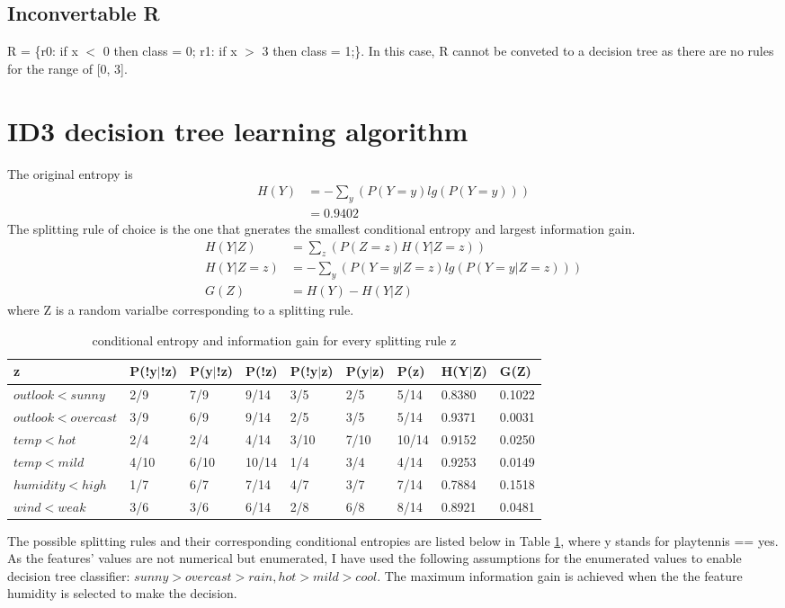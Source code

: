 \documentclass[12pt]{article}
\begin{document}
\subsection{Inconvertable R}
R = \{r0: if x $<$ 0 then class = 0; r1: if x $>$ 3 then class = 1;\}. In this case, R cannot be conveted to a decision tree as there are no rules for the range of [0, 3].
\section{ID3 decision tree learning algorithm}
The original entropy is 
\begin{align}
  H(Y) &= - \sum_{y} (P(Y = y) lg(P(Y = y))) \\
  &= 0.9402
\end{align}
The splitting rule of choice is the one that gnerates the smallest conditional entropy and largest information gain.
\begin{align}
  H(Y|Z) &= \sum_{z} (P(Z = z) H(Y | Z = z)) \\
  H(Y|Z=z) &= - \sum_{y} (P(Y = y|Z=z) lg(P(Y = y|Z=z))) \\
  G(Z) &= H(Y) - H(Y|Z)
\end{align}
where Z is a random varialbe corresponding to a splitting rule.
\begin{table}[htb]
  \centering
  \begin{tabularx}{\textwidth}{|l|l|l|l|l|l|l|l|X|} \hline
    z & P(!y$|$!z) & P(y$|$!z) & P(!z) & P(!y$|$z) & P(y$|$z) & P(z) & H(Y$|$Z) & G(Z) \\ \hline
    $outlook<sunny$ & 2/9 & 7/9 & 9/14 & 3/5 & 2/5 & 5/14 & 0.8380 & 0.1022 \\ \hline
    $outlook<overcast$ & 3/9 & 6/9 & 9/14 & 2/5 & 3/5 & 5/14 & 0.9371 & 0.0031 \\ \hline
    $temp<hot$ & 2/4 & 2/4 & 4/14 & 3/10 & 7/10 & 10/14 & 0.9152 & 0.0250 \\ \hline
    $temp<mild$ & 4/10 & 6/10 & 10/14 & 1/4 & 3/4 & 4/14 & 0.9253 & 0.0149 \\ \hline
    $humidity<high$ & 1/7 & 6/7 & 7/14 & 4/7 & 3/7 & 7/14 & 0.7884 & 0.1518 \\ \hline
    $wind<weak$ & 3/6 & 3/6 & 6/14 & 2/8 & 6/8 & 8/14 & 0.8921 & 0.0481 \\ \hline
  \end{tabularx}
  \caption{conditional entropy and information gain for every splitting rule z}
  \label{tab:entropy}
\end{table}
The possible splitting rules and their corresponding conditional entropies are listed below in Table \ref{tab:entropy}, where y stands for playtennis == yes. As the features' values are not numerical but enumerated, I have used the following assumptions for the enumerated values to enable decision tree classifier: $sunny > overcast > rain, hot > mild > cool$. The maximum information gain is achieved when the the feature humidity is selected to make the decision.
\end{document}

